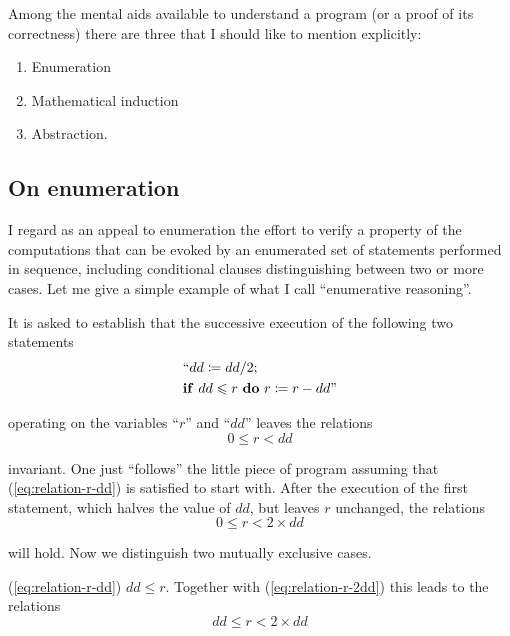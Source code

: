 Among the mental aids available to understand a program (or a proof of its correctness) there are three that I should like to mention explicitly:

\begin{enumerate}[leftmargin=2\parindent, label=(\arabic*)]
\item Enumeration
\item Mathematical induction
\item Abstraction.
\end{enumerate}

\subsection{On enumeration}
\label{subsec:enumeration}

I regard as an appeal to enumeration the effort to verify a property of the computations that can be evoked by an enumerated set of statements performed in sequence, including conditional clauses distinguishing between two or more cases. Let me give a simple example of what I call ``enumerative reasoning''.

It is asked to establish that the successive execution of the following two statements
\begin{equation*}
	\begin{split}
		&\text{``}dd \coloneq dd/2; \\
		&\text{\textbf{if} } dd \leqslant r \text{ \textbf{do} } r \coloneq r - dd\text{''}
	\end{split}
\end{equation*}

\noindent
operating on the variables ``$r$'' and ``$dd$'' leaves the relations
\begin{equation}
	\label{eq:relation-r-dd}
	0 \leqslant r < dd
\end{equation}

\noindent
invariant. One just ``follows'' the little piece of program assuming that (\ref{eq:relation-r-dd}) is satisfied to start with. After the execution of the first statement, which halves the value of $dd$, but leaves $r$ unchanged, the relations
\begin{equation}
	\label{eq:relation-r-2dd}
	0 \leqslant r < 2\times dd
\end{equation}

\noindent
will hold. Now we distinguish two mutually exclusive cases.

(\ref{eq:relation-r-dd}) $dd \leqslant r$. Together with (\ref{eq:relation-r-2dd}) this leads to the relations
\begin{equation}
	\label{eq:relation-dd-r-2dd}
	dd \leqslant r < 2\times dd
\end{equation}

